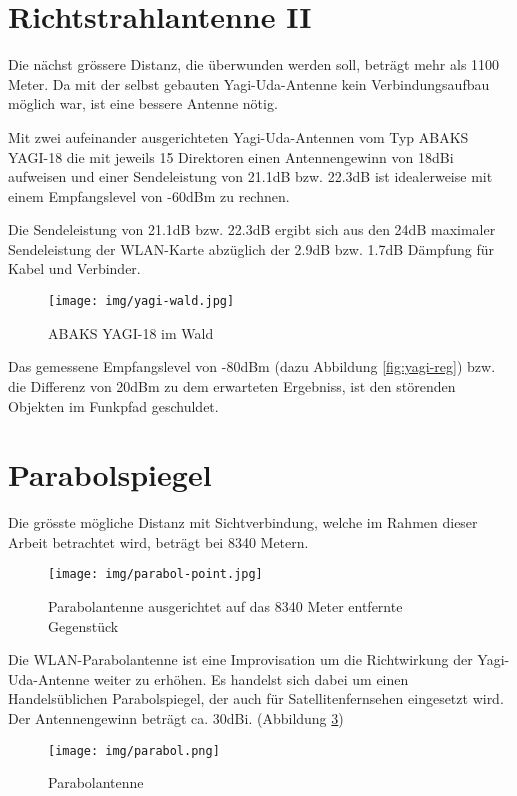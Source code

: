 \documentclass[oneside,11pt,parskip=half,ngerman]{scrreprt}
\makeatletter
\def\maxwidth{\ifdim\Gin@nat@width>\linewidth\linewidth
\else\Gin@nat@width\fi}
\let\Oldincludegraphics\includegraphics
\renewcommand{\includegraphics}[1]{\Oldincludegraphics[width=\maxwidth,height=20em,keepaspectratio]{#1}}
\makeatother
\begin{document}
\section{Richtstrahlantenne II}\label{richtstrahlantenne-ii}

Die nächst grössere Distanz, die überwunden werden soll, beträgt mehr
als 1100 Meter. Da mit der selbst gebauten Yagi-Uda-Antenne kein
Verbindungsaufbau möglich war, ist eine bessere Antenne nötig.

Mit zwei aufeinander ausgerichteten Yagi-Uda-Antennen vom Typ ABAKS
YAGI-18 die mit jeweils 15 Direktoren einen Antennengewinn von 18dBi
aufweisen und einer Sendeleistung von 21.1dB bzw. 22.3dB ist
idealerweise mit einem Empfangslevel von -60dBm zu rechnen.

Die Sendeleistung von 21.1dB bzw. 22.3dB ergibt sich aus den 24dB
maximaler Sendeleistung der WLAN-Karte abzüglich der 2.9dB bzw. 1.7dB
Dämpfung für Kabel und Verbinder.

\begin{figure}[htbp]
\centering
\texttt{[image: img/yagi-wald.jpg]}
\caption{ABAKS YAGI-18 im Wald\label{fig:yagi-18}}
\end{figure}

Das gemessene Empfangslevel von -80dBm (dazu Abbildung
\ref{fig:yagi-reg}) bzw. die Differenz von 20dBm zu dem erwarteten
Ergebniss, ist den störenden Objekten im Funkpfad geschuldet.

\section{Parabolspiegel}\label{parabolspiegel}

Die grösste mögliche Distanz mit Sichtverbindung, welche im Rahmen
dieser Arbeit betrachtet wird, beträgt bei 8340 Metern.

\begin{figure}[htbp]
\centering
\texttt{[image: img/parabol-point.jpg]}
\caption{Parabolantenne ausgerichtet auf das 8340 Meter entfernte
Gegenstück\label{fig:parabol-point}}
\end{figure}

Die WLAN-Parabolantenne ist eine Improvisation um die Richtwirkung der
Yagi-Uda-Antenne weiter zu erhöhen. Es handelst sich dabei um einen
Handelsüblichen Parabolspiegel, der auch für Satellitenfernsehen
eingesetzt wird. Der Antennengewinn beträgt ca. 30dBi. (Abbildung
\ref{fig:parabolantenne})

\begin{figure}[htbp]
\centering
\texttt{[image: img/parabol.png]}
\caption{Parabolantenne\label{fig:parabolantenne}}
\end{figure}
\end{document}

